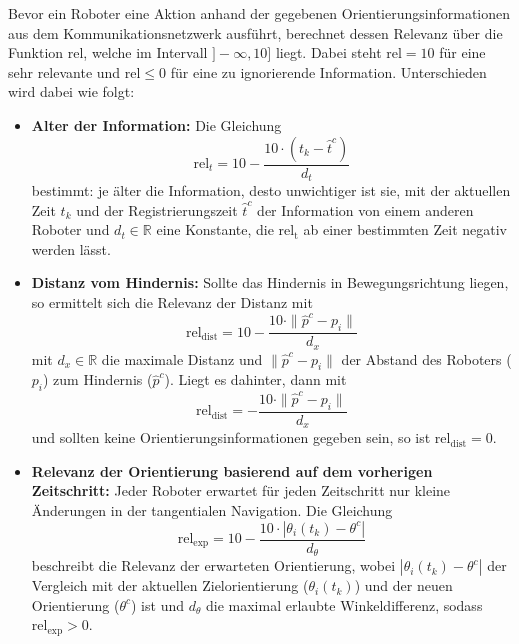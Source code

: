 \documentclass[conference]{IEEEtran}
\begin{document}
Bevor ein Roboter eine Aktion anhand der gegebenen Orientierungsinformationen aus 
dem Kommunikationsnetzwerk ausführt, berechnet dessen Relevanz über die Funktion \( \mathrm{rel} \), 
welche im Intervall \( ]-\infty, 10] \) liegt. Dabei steht \( \mathrm{rel}=10 \) für eine 
sehr relevante und \( \mathrm{rel} \leq 0 \) für eine zu ignorierende Information. 
Unterschieden wird dabei wie folgt:
\begin{itemize}
    \item \textbf{Alter der Information:}
    Die Gleichung
    \begin{equation}
    \mathrm{rel}_t = 10 - \frac{10 \cdot (t_k - \hat{t}^c)}{d_t}
    \end{equation}
    bestimmt: je älter die Information, desto unwichtiger ist sie, mit 
    der aktuellen Zeit \( t_k \) und der Registrierungszeit \( \hat{t}^c \) der Information von einem 
    anderen Roboter und \( d_t \in \mathbb{R} \) eine Konstante, die \( \mathrm{rel_t} \) ab einer
    bestimmten Zeit negativ werden lässt.
    
    \item \textbf{Distanz vom Hindernis:}
    Sollte das Hindernis in Bewegungsrichtung liegen, 
    so ermittelt sich die Relevanz der Distanz mit 
    \begin{equation}
    \mathrm{rel}_{\mathrm{dist}} = 10 - \frac{10 \cdot \| \hat{p}^c - p_i \|}{d_x}
    \end{equation}
    mit \( d_x \in \mathbb{R} \) die maximale Distanz und \( \| \hat{p}^c - p_i \| \) der Abstand des Roboters ($p_i$) 
    zum Hindernis ($\hat{p}^c$). Liegt es dahinter, dann mit
    \begin{equation}
    \mathrm{rel}_{\mathrm{dist}} = - \frac{10 \cdot \| \hat{p}^c - p_i \|}{d_x}
    \end{equation}
    und sollten keine Orientierungsinformationen gegeben sein, so 
    ist \( \mathrm{rel}_{\mathrm{dist}} = 0 \).
    
    \item \textbf{Relevanz der Orientierung basierend auf dem vorherigen Zeitschritt:}
    Jeder Roboter erwartet für jeden Zeitschritt nur kleine Änderungen in der tangentialen 
    Navigation. Die Gleichung 
    \begin{equation}
    \mathrm{rel}_{\mathrm{exp}} = 10 - \frac{10 \cdot | \theta_i(t_k) - \theta^c |}{d_\theta}
    \end{equation}
    beschreibt die Relevanz der erwarteten Orientierung, wobei 
    \( |\theta_i(t_k) - \theta^c| \) der Vergleich mit der aktuellen Zielorientierung ($\theta_i(t_k)$) und 
    der neuen Orientierung ($\theta^c$) ist und \( d_\theta \) die maximal erlaubte Winkeldifferenz, sodass
    \( \mathrm{rel}_{\mathrm{exp}} > 0 \).
    

\end{itemize}
\end{document}
